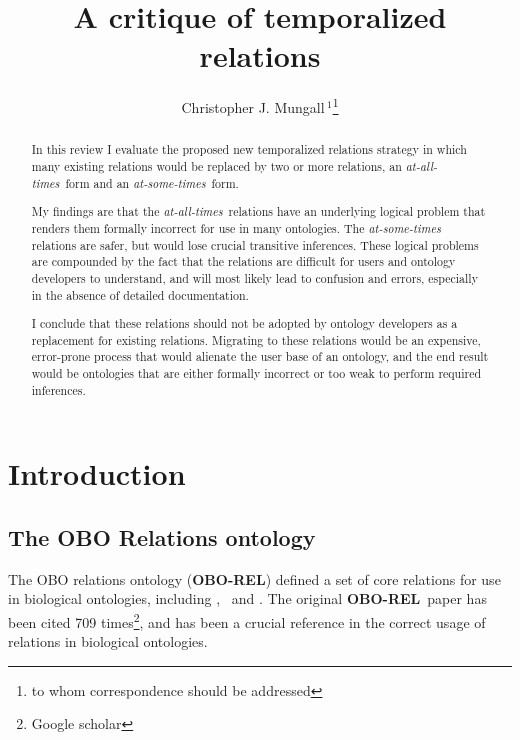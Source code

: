 \documentclass{bioinfo}
\def\partOf{\pr{part\_of}}
\def\isA{\pr{is\_a}}
\def\derivesFrom{\pr{derives\_from}}
\def\OBOREL{\textbf{OBO-REL}}
\begin{document}

\title{A critique of temporalized relations}

\author{Christopher J. Mungall\,$^{1}$\footnote{to whom correspondence should be addressed}}
\address{$^{1}$Genomics Division, Lawrence Berkeley National Laboratory, MS84R017, 1 Cyclotron Road, Berkeley, CA 94720 USA}

\history{}

\editor{}

\maketitle

\begin{abstract}

  In this review I evaluate the proposed new temporalized relations
  strategy in which many existing relations would be replaced by two
  or more relations, an \emph{at-all-times}\ form and an
  \emph{at-some-times}\ form.

  My findings are that the \emph{at-all-times}\ relations have an
  underlying logical problem that renders them formally incorrect for
  use in many ontologies. The \emph{at-some-times} relations are
  safer, but would lose crucial transitive inferences. These logical
  problems are compounded by the fact that the relations are difficult
  for users and ontology developers to understand, and will most
  likely lead to confusion and errors, especially in the absence of
  detailed documentation.

  I conclude that these relations should not be adopted by ontology
  developers as a replacement for existing relations. Migrating to
  these relations would be an expensive, error-prone process that
  would alienate the user base of an ontology, and the end result
  would be ontologies that are either formally incorrect or too weak
  to perform required inferences.

\end{abstract}

\section{Introduction}

\subsection{The OBO Relations ontology}


The OBO relations ontology (\OBOREL) defined a set of core relations
for use in biological ontologies, including \isA, \partOf\ and
\derivesFrom\cite{Smith2005}. The original \OBOREL\ paper has been
cited 709 times\footnote{Google scholar}, and has been a crucial
reference in the correct usage of relations in biological ontologies.
\end{document}

